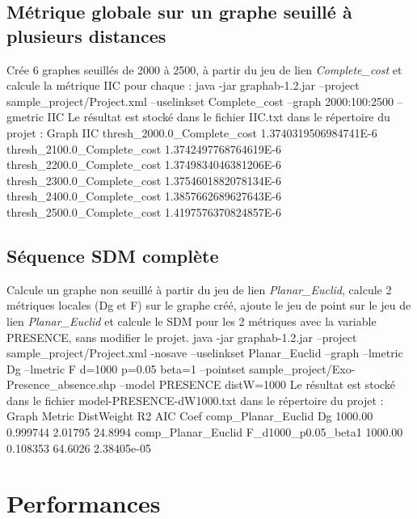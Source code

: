 \documentclass[a4paper,10pt]{report}
\newenvironment{cmd}
{\quote\Verbatim}
{\endVerbatim\endquote}
\begin{document}
\section{Métrique globale sur un graphe seuillé à plusieurs distances}
Crée 6 graphes seuillés de 2000 à 2500, à partir du jeu de lien \textit{Complete\_cost} et calcule la métrique IIC pour chaque :
\begin{cmd}
java -jar graphab-1.2.jar --project sample_project/Project.xml --uselinkset Complete_cost
  --graph 2000:100:2500 --gmetric IIC
\end{cmd}
Le résultat est stocké dans le fichier IIC.txt dans le répertoire du projet :
\begin{cmd}
Graph	IIC
thresh_2000.0_Complete_cost	1.3740319506984741E-6
thresh_2100.0_Complete_cost	1.3742497768764619E-6
thresh_2200.0_Complete_cost	1.3749834046381206E-6
thresh_2300.0_Complete_cost	1.3754601882078134E-6
thresh_2400.0_Complete_cost	1.3857662689627643E-6
thresh_2500.0_Complete_cost	1.4197576370824857E-6
\end{cmd}

\section{Séquence SDM complète}
Calcule un graphe non seuillé à partir du jeu de lien \textit{Planar\_Euclid}, calcule 2 métriques locales (Dg et F) sur le graphe créé, ajoute le jeu de point 
sur le jeu de lien \textit{Planar\_Euclid} et calcule le SDM pour les 2 métriques avec la variable PRESENCE, sans modifier le projet.
\begin{cmd}
java -jar graphab-1.2.jar --project sample_project/Project.xml -nosave 
  --uselinkset Planar_Euclid 
  --graph 
  --lmetric Dg --lmetric F d=1000 p=0.05 beta=1 
  --pointset sample_project/Exo-Presence_absence.shp 
  --model PRESENCE distW=1000
\end{cmd}
Le résultat est stocké dans le fichier model-PRESENCE-dW1000.txt dans le répertoire du projet :
\begin{cmd}
Graph               Metric              DistWeight R2        AIC      Coef
comp_Planar_Euclid  Dg                  1000.00    0.999744  2.01795  24.8994
comp_Planar_Euclid  F_d1000_p0.05_beta1 1000.00    0.108353  64.6026  2.38405e-05
\end{cmd}

\chapter{Performances}
\end{document}
